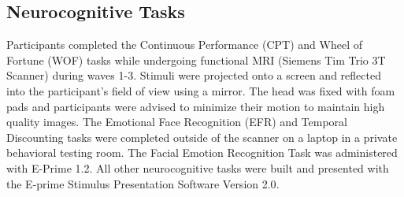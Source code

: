 \documentclass[utf8]{frontiersSCNS} %
\begin{document}
\subsection{Neurocognitive Tasks}  Participants completed the Continuous Performance (CPT) and Wheel of Fortune (WOF) tasks while undergoing functional MRI (Siemens Tim Trio 3T Scanner) during waves 1-3. Stimuli were projected onto a screen and reflected into the participant's field of view using a mirror. The head was fixed with foam pads and participants were advised to minimize their motion to maintain high quality images. The Emotional Face Recognition (EFR) and Temporal Discounting tasks were completed outside of the scanner on a laptop in a private behavioral testing room. The Facial Emotion Recognition Task was administered with E-Prime 1.2. All other neurocognitive tasks were built and presented with the E-prime Stimulus Presentation Software Version 2.0\citep{schneider2002prime}. 
\end{document}
